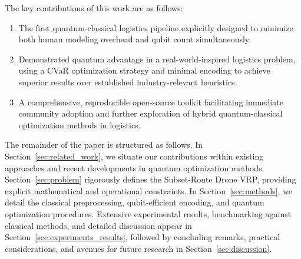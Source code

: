 The key contributions of this work are as follows:
\begin{enumerate}
\item The first quantum-classical logistics pipeline explicitly designed to minimize both human modeling overhead and qubit count simultaneously.
\item Demonstrated quantum advantage in a real-world-inspired logistics problem, using a CVaR optimization strategy and minimal encoding to achieve superior results over established industry-relevant heuristics.
\item A comprehensive, reproducible open-source toolkit facilitating immediate community adoption and further exploration of hybrid quantum-classical optimization methods in logistics.
\end{enumerate}

The remainder of the paper is structured as follows. 
In Section~\ref{sec:related_work}, we situate our contributions within existing approaches and recent developments in quantum optimization methods.
Section~\ref{sec:problem} rigorously defines the Subset-Route Drone VRP, providing explicit mathematical and operational constraints.
In Section~\ref{sec:methods}, we detail the classical preprocessing, qubit-efficient encoding, and quantum optimization procedures.
Extensive experimental results, benchmarking against classical methods, and detailed discussion appear in Section~\ref{sec:experiments_results},
followed by concluding remarks, practical considerations, and avenues for future research in Section~\ref{sec:discussion}.